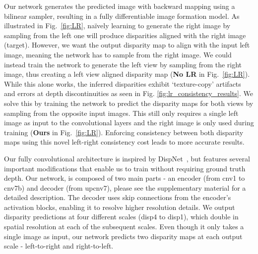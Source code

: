 \documentclass[10pt,twocolumn,letterpaper]{article}
\begin{document}
Our network generates the predicted image with backward mapping using a bilinear sampler, resulting in a fully differentiable image formation model. 
As illustrated in Fig.~\ref{fig:LR}, na\"ively learning to generate the right image by sampling from the left one will produce disparities aligned with the right image (target).
However, we want the output disparity map to align with the input left image, meaning the network has to sample from the right image.
We could instead train the network to generate the left view by sampling from the right image, thus creating a left view aligned disparity map (\textbf{No LR} in Fig.~\ref{fig:LR}). 
While this alone works, the inferred disparities exhibit `texture-copy' artifacts and errors at depth discontinuities as seen in Fig. \ref{fig:lr_consistency_results}.
We solve this by training the network to predict the disparity maps for both views by sampling from the opposite input images. 
This still only requires a single left image as input to the convolutional layers and the right image is only used during training (\textbf{Ours} in Fig.~\ref{fig:LR}). 
Enforcing consistency between both disparity maps using this novel left-right consistency cost leads to more accurate results.

Our fully convolutional architecture is inspired by DispNet~\cite{mayer2015large}, but features several important modifications that enable us to train without requiring ground truth depth. 
Our network, is composed of two main parts - an encoder (from cnv1 to cnv7b) and decoder (from upcnv7), please see the supplementary material for a detailed description.
The decoder uses skip connections \cite{shelhamer2016fully} from the encoder's activation blocks, enabling it to resolve higher resolution details. 
We output disparity predictions at four different scales (disp4 to disp1), which double in spatial resolution at each of the subsequent scales. 
Even though it only takes a single image as input, our network predicts two disparity maps at each output scale - left-to-right and right-to-left.
\end{document}
